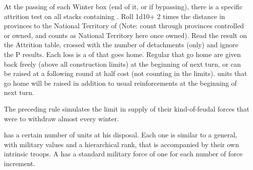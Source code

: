 


\label{chSpecific:Turkey:Yearly Campaigning}
At the passing of each Winter box (end of it, or if bypassing), there
is a specific attrition test on all stacks containing \Timar.
\bparag Roll 1d10+ 2 times the distance in provinces to the National
Territory of \TUR (Note: count through provinces controlled or owned,
 and  counts as National Territory here once
owned).
\bparag Read the result on the Attrition table, crossed with the number
of \Timar detachments (only) and ignore the P results.
\bparag Each loss is a \LD of \Timar that goes home.  Regular \Timar \LD
that go home are given back freely (above all construction limits) at
the beginning of next turn, or can be raised at a following round at
half cost (not counting in the limits).  \Pasha units that go home will
be raised in addition to usual reinforcements at the beginning of next
turn.

\begin{designnote}
  The preceding rule simulates the limit in supply of their
  kind-of-feudal forces that were to withdraw almost every winter.
\end{designnote}

\aparag[Pashas]\label{chSpecific:Turkey:Pashas}
\TUR has a certain number of \Pasha units at his disposal. Each one
is similar to a general, with military values and a hierarchical rank,
that is accompanied by their own intrinsic troops. A \Pasha has a
standard military force of one \Timar \LD for each number of force
increment.

